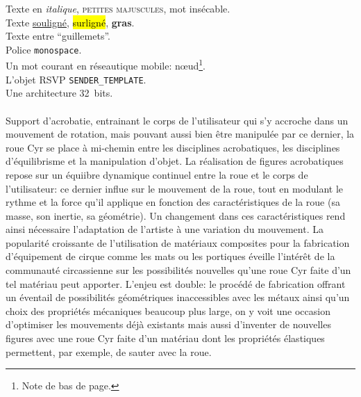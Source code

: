 \label{sec:Introduction}  %
Texte en \emph{italique}, \textsc{petites majuscules}, mot \mbox{insécable}.\\
Texte \ul{souligné}, \hl{surligné}, \textbf{gras}.\\
Texte entre ``guillemets''.\\
Police \texttt{monospace}.\\
Un mot courant en réseautique mobile: n\oe{}ud\footnote{Note de bas de page.}.\\
L'objet RSVP \texttt{SENDER\_TEMPLATE}.\\
Une architecture 32~bits.\\
\\
Support d'acrobatie, entrainant le corps de l'utilisateur qui s'y accroche dans un mouvement de rotation, mais pouvant aussi bien être manipulée par ce dernier, la roue Cyr se place à mi-chemin entre les disciplines acrobatiques, les disciplines d'équilibrisme et la manipulation d'objet. La réalisation de figures acrobatiques repose sur un équiibre dynamique continuel entre la roue et le corps de l'utilisateur: ce dernier influe sur le mouvement de la roue, tout en modulant le rythme et la force qu'il applique en fonction des caractéristiques de la roue (sa masse, son inertie, sa géométrie). Un changement dans ces caractéristiques rend ainsi nécessaire l'adaptation de l'artiste à une variation du mouvement. La popularité croissante de l'utilisation de matériaux composites pour la fabrication d'équipement de cirque comme les mats ou les portiques éveille l'intérêt de la communauté circassienne sur les possibilités nouvelles qu'une roue Cyr faite d'un tel matériau peut apporter. L'enjeu est double: le procédé de fabrication offrant un éventail de possibilités géométriques inaccessibles avec les métaux ainsi qu'un choix des propriétés mécaniques beaucoup plus large, on y voit une occasion d'optimiser les mouvements déjà existants mais aussi d'inventer de nouvelles figures avec une roue Cyr faite d'un matériau dont les propriétés élastiques permettent, par exemple, de sauter avec la roue.
